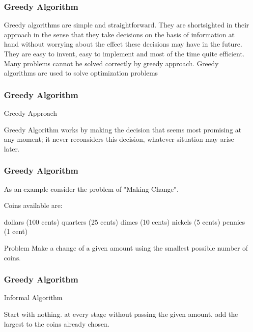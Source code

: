 
\begin{frame}
\frametitle{Greedy Algorithm}




Greedy algorithms are simple and straightforward. They are shortsighted in their approach in the sense that they take decisions on the basis of information at hand without worrying about the effect these decisions may have in the future. They are easy to invent, easy to implement and most of the time quite efficient. Many problems cannot be solved correctly by greedy approach. Greedy algorithms are used to solve optimization problems


\end{frame}
\begin{frame}
\frametitle{Greedy Algorithm}


Greedy Approach

Greedy Algorithm works by making the decision that seems most promising at any moment; it never reconsiders this decision, whatever situation may arise later.


\end{frame}
\begin{frame}
\frametitle{Greedy Algorithm}
As an example consider the problem of "Making Change".

Coins available are:

dollars (100 cents)
quarters (25 cents)
dimes (10 cents)
nickels (5 cents)
pennies (1 cent)
 

Problem    Make a change of a given amount using the smallest possible number of coins.

\end{frame}
\begin{frame}
\frametitle{Greedy Algorithm}
 

Informal Algorithm

Start with nothing.
at every stage without passing the given amount.
add the largest to the coins already chosen.
 
 
\end{frame}
